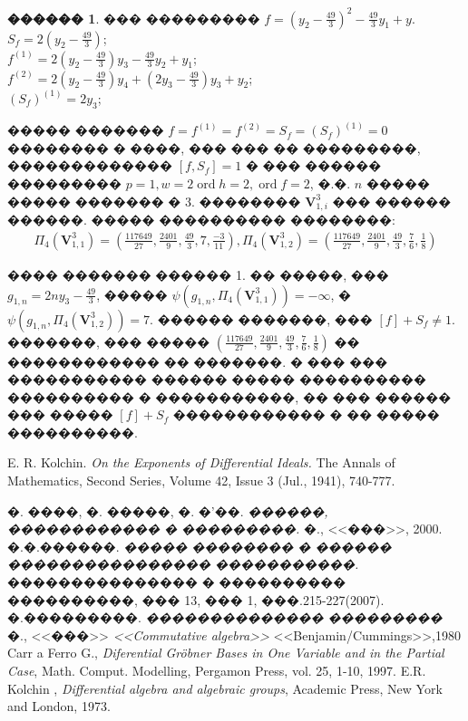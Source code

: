 \documentclass[16pt]{article}
\DeclareMathOperator{\ord}{ord}
\theoremstyle{plain}
\theoremstyle{definition}
\newtheorem{example}[theorem]{������}
\theoremstyle{remark}
\begin{document}
\begin{example}
��� ��������� $f=(y_2-\frac{49}{3})^2-\frac{49}{3}y_1+y$.
\\
$S_f=2(y_2-\frac{49}{3})$;
\\
$f^{(1)}=2(y_2-\frac{49}{3})y_3-\frac{49}{3}y_2+y_1$;
\\
$f^{(2)}=2(y_2-\frac{49}{3})y_4+(2y_3-\frac{49}{3})y_3+y_2$;
\\
$(S_f)^{(1)}=2y_3$;

����� ������� $f=f^{(1)}=f^{(2)}=S_f=(S_f)^{(1)}=0$ �������� � ����,
��� ��� �� ���������, ������������� $[f,S_f]=1$ �  ��� ������
��������� $p=1,w=2\ord{h}=2,\ord{f}=2$, �.�. $n$  ����� ����� ������� � $3$. �������� $\mathbf{V}_{1,i}^3$ ��� ������ ������. ����� ���������� ��������: 
\begin{gather*}
\Pi_{4}(\mathbf{V}_{1,1}^3)=\left(\frac{117649}{27},\frac{2401}{9},\frac{49}{3},7,\frac{-3}{11}\right),
\Pi_{4}(\mathbf{V}_{1,2}^3)=\left(\frac{117649}{27},\frac{2401}{9},\frac{49}{3},\frac{7}{6},\frac{1}{8}\right)
\end{gather*}

���� ������� ������ 1. �� �����, ��� $g_{1,n}=2ny_3-\frac{49}{3}$, ����� $\psi(g_{1,n},\Pi_{4}(\mathbf{V}_{1,1}^3))=-\infty$, � $\psi(g_{1,n},\Pi_{4}(\mathbf{V}_{1,2}^3))=7$. ������ �������, ��� $[f]+S_f\not=1$. �������, ��� ����� $\left(\frac{117649}{27},\frac{2401}{9},\frac{49}{3},\frac{7}{6},\frac{1}{8}\right)$ �� ������������ �� �������.  � ��� ��� ����������� ������ ����� ���������� ���������� � �����������, �� ��� ������ ��� ����� $[f]+S_f$ ������������ � �� ����� ����������.


\end{example}







\begin{thebibliography}{99}

E. R. Kolchin.
\emph{On the Exponents of Differential Ideals.}
The Annals of Mathematics, Second Series, Volume 42, Issue 3 (Jul., 1941), 740-777.

�. ����, �. �����, �. �'��.
\emph{������, ������������ � ���������.}
�., <<���>>, 2000.
�.�.������.
\emph{����� �������� � ������ ���������������� �����������.}
��������������� � ���������� ����������, ��� 13, ��� 1, ���.215-227(2007).
�.���������.
\emph{�������������� ���������}
�., <<���>>
\emph{<<Commutative algebra>>}
<<Benjamin/Cummings>>,1980
Carr a Ferro G.,
\emph{ Diferential Gr\"{o}bner Bases in One Variable and in the Partial Case},
Math. Comput. Modelling, Pergamon Press, vol. 25, 1-10, 1997.
E.R. Kolchin ,
\emph{ Differential algebra and algebraic groups}, Academic Press, New York and London, 1973.
\end{thebibliography}
\end{document}
